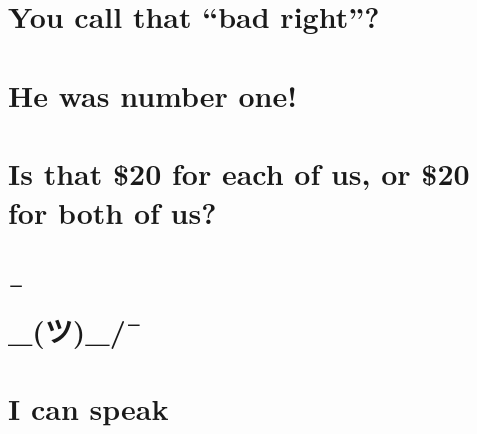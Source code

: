 \chapter{You call that ``bad right''?} %

\chapter{He was number one!} %

\chapter{Is that \$20 for each of us, or \$20 for both of us?} %

\chapter{} %

\chapter{¯\\_(ツ)_/¯} %

\chapter{I can speak } %


